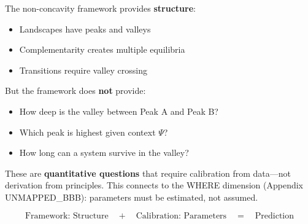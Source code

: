 The non-concavity framework provides \textbf{structure}:
\begin{itemize}
\item Landscapes have peaks and valleys
\item Complementarity creates multiple equilibria
\item Transitions require valley crossing
\end{itemize}

But the framework does \textbf{not} provide:
\begin{itemize}
\item How deep is the valley between Peak A and Peak B?
\item Which peak is highest given context $\Psi$?
\item How long can a system survive in the valley?
\end{itemize}

These are \textbf{quantitative questions} that require calibration from data---not derivation from principles. This connects to the WHERE dimension (Appendix UNMAPPED_BBB): parameters must be estimated, not assumed.

\begin{equation}
\boxed{\text{Framework: Structure} \quad + \quad \text{Calibration: Parameters} \quad = \quad \text{Prediction}}
\end{equation}


